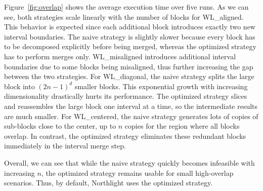 \documentclass[conference]{IEEEtran}
\newcommand{\system}{Northlight}
\begin{document}
Figure~\ref{fig:overlap} shows the average execution time over five runs.
As we can see, both strategies scale linearly with the number of blocks for WL\_aligned. This behavior is expected since each additional block introduces exactly two new interval boundaries.
The naive strategy is slightly slower because every block has to be decomposed explicitly before being merged, whereas the optimized strategy has to perform merges only.
WL\_misaligned introduces additional interval boundaries due to some blocks being misaligned, thus further increasing the gap between the two strategies.
For WL\_diagonal, the naive strategy splits the large block into $(2n-1)^d$ smaller blocks. This exponential growth with increasing dimensionality drastically hurts its performance. The optimized strategy slices and reassembles the large block one interval at a time, so the intermediate results are much smaller.
For WL\_centered, the naive strategy generates lots of copies of sub-blocks close to the center, up to $n$ copies for the region where all blocks overlap. In contrast, the optimized strategy eliminates these redundant blocks immediately in the interval merge step.

Overall, we can see that while the naive strategy quickly becomes infeasible with increasing $n$, the optimized strategy remains usable for small high-overlap scenarios. Thus, by default, \system{} uses the optimized strategy. 
\end{document}
